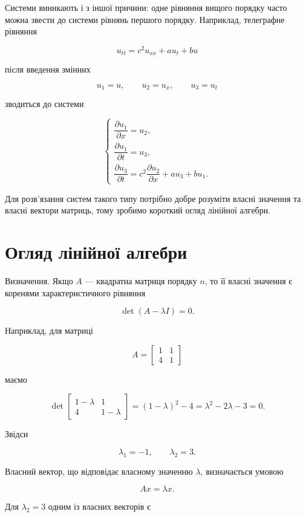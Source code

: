 \documentclass[
  ukrainian,
]{article}
\begin{document}
Системи виникають і з іншої причини: одне рівняння вищого порядку часто
можна звести до системи рівнянь першого порядку. Наприклад, телеграфне
рівняння

\[
u_{tt} = c^2 u_{xx} + a u_t + b u
\]

після введення змінних

\[
u_1=u,\qquad u_2=u_x,\qquad u_3=u_t
\]

зводиться до системи

\[
\begin{cases}
\dfrac{\partial u_1}{\partial x} = u_2,\\[4pt]
\dfrac{\partial u_1}{\partial t} = u_3,\\[4pt]
\dfrac{\partial u_3}{\partial t} = c^2 \dfrac{\partial u_2}{\partial x} + a u_3 + b u_1.
\end{cases}
\]

Для розв'язання систем такого типу потрібно добре розуміти власні
значення та власні вектори матриць, тому зробимо короткий огляд лінійної
алгебри.

\section{Огляд лінійної
алгебри}\label{ux43eux433ux43bux44fux434-ux43bux456ux43dux456ux439ux43dux43eux457-ux430ux43bux433ux435ux431ux440ux438}

Визначення. Якщо \(A\) --- квадратна матриця порядку \(n\), то її власні
значення є коренями характеристичного рівняння

\[
\det(A-\lambda I)=0.
\]

Наприклад, для матриці

\[
A=\begin{bmatrix} 1 & 1 \\ 4 & 1 \end{bmatrix}
\]

маємо

\[
\det\!\begin{bmatrix} 1-\lambda & 1 \\ 4 & 1-\lambda \end{bmatrix}
= (1-\lambda)^2 - 4
= \lambda^2 - 2\lambda - 3 = 0.
\]

Звідси

\[
\lambda_1=-1,\qquad \lambda_2=3.
\]

Власний вектор, що відповідає власному значенню \(\lambda\),
визначається умовою

\[
Ax=\lambda x.
\]

Для \(\lambda_2=3\) одним із власних векторів є
\end{document}
